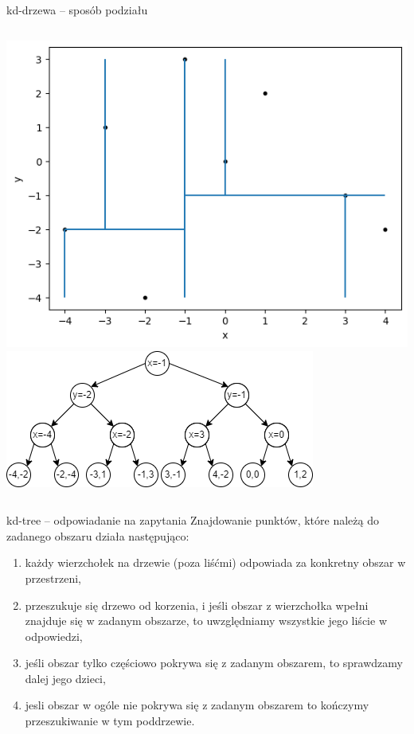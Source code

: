 \documentclass[aspectratio=169,dvipsnames]{beamer}
\begin{document}
\begin{frame}{kd-drzewa -- sposób podziału}
    \begin{columns}
        \includegraphics[width=\textwidth]{images/plots/8}
        \includegraphics[width=\textwidth]{images/trees/12.drawio}
    \end{columns}
\end{frame}

\begin{frame}{kd-tree -- odpowiadanie na zapytania}
    Znajdowanie punktów, które należą do zadanego obszaru działa następująco:
    \begin{enumerate}
        \item<2-> każdy wierzchołek na drzewie (poza liśćmi) odpowiada za konkretny obszar w przestrzeni,
        \item<3-> przeszukuje się drzewo od korzenia, i jeśli obszar z wierzchołka wpełni znajduje się w zadanym obszarze, to uwzględniamy wszystkie jego liście w odpowiedzi,
        \item<4-> jeśli obszar tylko częściowo pokrywa się z zadanym obszarem, to sprawdzamy dalej jego dzieci,
        \item<5-> jesli obszar w ogóle nie pokrywa się z zadanym obszarem to kończymy przeszukiwanie w tym poddrzewie.
    \end{enumerate}
\end{frame}
\end{document}
